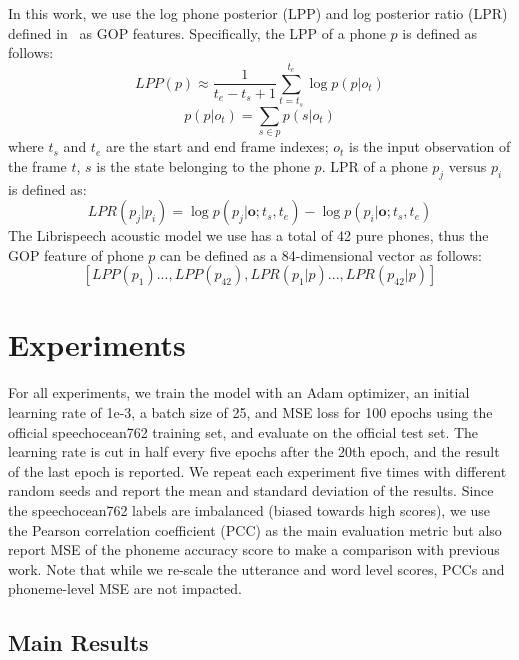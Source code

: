 \documentclass{article}
\newcommand{\squeezeup}{\vspace{-1.6mm}}
\begin{document}
In this work, we use the log phone posterior (LPP) and log posterior ratio (LPR) defined in~\cite{hu2015improved} as GOP features. Specifically, the LPP of a phone $p$ is defined as follows:
\begin{equation}
    LPP(p) \approx \frac{1}{t_e-t_s+1} \sum_{t=t_s}^{t_e}\log p(p|o_t)
\end{equation}
\begin{equation}
    p(p|o_t) = \sum_{s \in p} p(s|o_t)
\end{equation}
where $t_s$ and $t_e$ are the start and end frame indexes; $o_t$ is the input observation of the frame $t$, $s$ is the state belonging to the phone $p$. LPR of a phone $p_j$ versus $p_i$ is defined as:
\begin{equation}
    LPR(p_j|p_i) = \log p(p_j|\mathbf o; t_s, t_e) - \log p(p_i|\mathbf o; t_s, t_e)
\end{equation}
The Librispeech acoustic model we use has a total of 42 pure phones, thus the GOP feature of phone $p$ can be defined as a 84-dimensional vector as follows:
\begin{equation}
    {[LPP(p_1)...,LPP(p_{42}), LPR(p_1|p)..., LPR(p_{42}|p)]}
\end{equation}

\squeezeup\squeezeup
\section{Experiments}
\squeezeup

For all experiments, we train the model with an Adam optimizer, an initial learning rate of 1e-3, a batch size of 25, and MSE loss for 100 epochs using the official speechocean762 training set, and evaluate on the official test set. The learning rate is cut in half every five epochs after the 20th epoch, and the result of the last epoch is reported. We repeat each experiment five times with different random seeds and report the mean and standard deviation of the results. Since the speechocean762 labels are imbalanced (biased towards high scores), we use the Pearson correlation coefficient (PCC) as the main evaluation metric but also report MSE of the phoneme accuracy score to make a comparison with previous work. Note that while we re-scale the utterance and word level scores, PCCs and phoneme-level MSE are not impacted. 

\subsection{Main Results}
\end{document}
